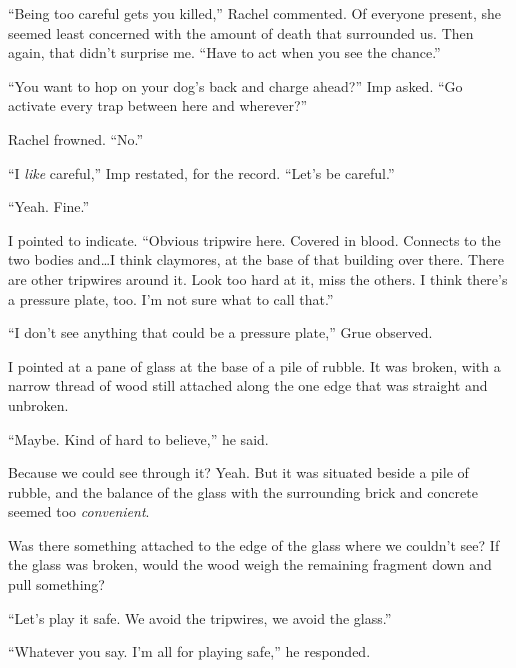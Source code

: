 ``Being too careful gets you killed,'' Rachel commented.  Of everyone present, she seemed least concerned with the amount of death that surrounded us.  Then again, that didn't surprise me.  ``Have to act when you see the chance.''



``You want to hop on your dog's back and charge ahead?'' Imp asked.  ``Go activate every trap between here and wherever?''



Rachel frowned.  ``No.''



``I \emph{like} careful,'' Imp restated, for the record.  ``Let's be careful.''



``Yeah.  Fine.''



I pointed to indicate.  ``Obvious tripwire here.  Covered in blood.  Connects to the two bodies and\ldots I think claymores, at the base of that building over there.  There are other tripwires around it.  Look too hard at it, miss the others.  I think there's a pressure plate, too.  I'm not sure what to call that.''



``I don't see anything that could be a pressure plate,'' Grue observed.



I pointed at a pane of glass at the base of a pile of rubble.  It was broken, with a narrow thread of wood still attached along the one edge that was straight and unbroken.



``Maybe.  Kind of hard to believe,'' he said.



Because we could see through it?  Yeah.  But it was situated beside a pile of rubble, and the balance of the glass with the surrounding brick and concrete seemed too \emph{convenient}.



Was there something attached to the edge of the glass where we couldn't see?  If the glass was broken, would the wood weigh the remaining fragment down and pull something?



``Let's play it safe.  We avoid the tripwires, we avoid the glass.''



``Whatever you say.  I'm all for playing safe,'' he responded.



